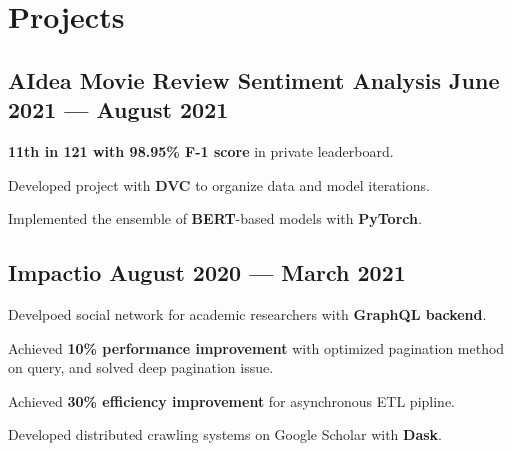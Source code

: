 \section{Projects}



\subsection*{AIdea Movie Review Sentiment Analysis \hfill June 2021 --- August 2021} 
\begin{zitemize}
    \item \textbf{11th in 121 with 98.95\% F-1 score} in private leaderboard.
    \item Developed project with \textbf{DVC} to organize data and model iterations.
    \item Implemented the ensemble of \textbf{BERT}-based models with \textbf{PyTorch}.
\end{zitemize}


\subsection*{Impactio \hfill August 2020 --- March 2021} 
    \begin{zitemize}
        \item Develpoed social network for academic researchers with \textbf{GraphQL backend}.
        \item Achieved \textbf{10\% performance improvement} with optimized pagination method on query, and solved deep pagination issue.
        \item Achieved \textbf{30\% efficiency improvement} for asynchronous ETL pipline.
        \item Developed distributed crawling systems on Google Scholar with \textbf{Dask}.
    \end{zitemize}


